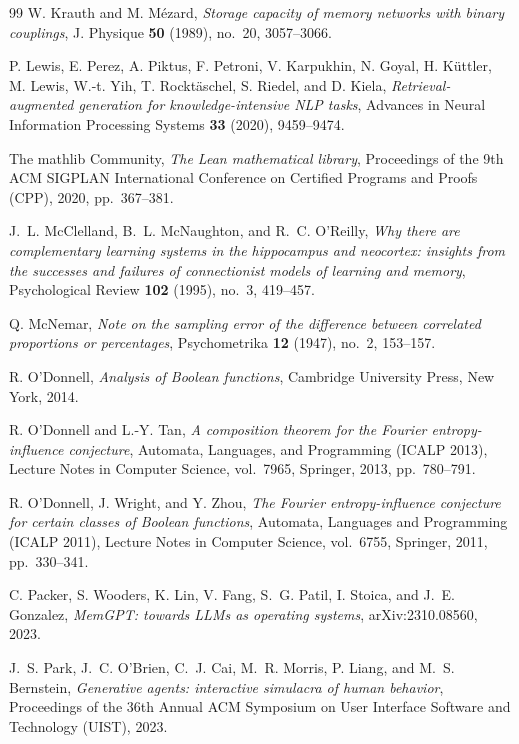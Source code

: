 \begin{thebibliography}{99}
W. Krauth and M. M\'ezard, \emph{Storage capacity of memory networks with binary couplings}, J. Physique \textbf{50} (1989), no.~20, 3057--3066.

P. Lewis, E. Perez, A. Piktus, F. Petroni, V. Karpukhin, N. Goyal, H. K\"uttler, M. Lewis, W.-t. Yih, T. Rockt\"aschel, S. Riedel, and D. Kiela, \emph{Retrieval-augmented generation for knowledge-intensive NLP tasks}, Advances in Neural Information Processing Systems \textbf{33} (2020), 9459--9474.

The mathlib Community, \emph{The Lean mathematical library}, Proceedings of the 9th ACM SIGPLAN International Conference on Certified Programs and Proofs (CPP), 2020, pp.~367--381.

J.~L. McClelland, B.~L. McNaughton, and R.~C. O'Reilly, \emph{Why there are complementary learning systems in the hippocampus and neocortex: insights from the successes and failures of connectionist models of learning and memory}, Psychological Review \textbf{102} (1995), no.~3, 419--457.

Q. McNemar, \emph{Note on the sampling error of the difference between correlated proportions or percentages}, Psychometrika \textbf{12} (1947), no.~2, 153--157.

R. O'Donnell, \emph{Analysis of Boolean functions}, Cambridge University Press, New York, 2014.

R. O'Donnell and L.-Y. Tan, \emph{A composition theorem for the Fourier entropy-influence conjecture}, Automata, Languages, and Programming (ICALP 2013), Lecture Notes in Computer Science, vol.~7965, Springer, 2013, pp.~780--791.

R. O'Donnell, J. Wright, and Y. Zhou, \emph{The Fourier entropy-influence conjecture for certain classes of Boolean functions}, Automata, Languages and Programming (ICALP 2011), Lecture Notes in Computer Science, vol.~6755, Springer, 2011, pp.~330--341.

C. Packer, S. Wooders, K. Lin, V. Fang, S.~G. Patil, I. Stoica, and J.~E. Gonzalez, \emph{MemGPT: towards LLMs as operating systems}, arXiv:2310.08560, 2023.

J.~S. Park, J.~C. O'Brien, C.~J. Cai, M.~R. Morris, P. Liang, and M.~S. Bernstein, \emph{Generative agents: interactive simulacra of human behavior}, Proceedings of the 36th Annual ACM Symposium on User Interface Software and Technology (UIST), 2023.


\end{thebibliography}
